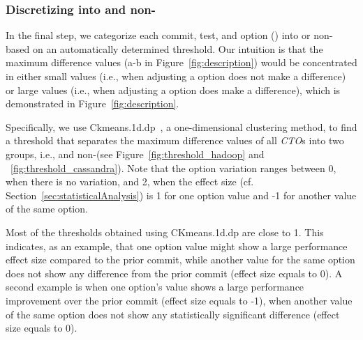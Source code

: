 

\subsubsection{Discretizing \instance into \inconsistent and non-\inconsistent}
\label{sec:discretizing}
In the final step, we categorize each commit, test, and option (\instance) into \inconsistent or non-\inconsistent %
based on an automatically determined threshold. Our intuition is that the maximum difference values (a-b in Figure~\ref{fig:description}) would be concentrated in either small values %
(i.e., when adjusting a option does not make a difference) or large values (i.e., when adjusting a option does make a difference), which is demonstrated in Figure~\ref{fig:description}. %

Specifically, we use Ckmeans.1d.dp~\cite{Ckmeans138:online}, a one-dimensional clustering method, to find a threshold that separates the maximum difference values of all \emph{CTO}s %
into two groups, i.e., \inconsistent and non-\inconsistent (see Figure~\ref{fig:threshold_hadoop} and ~\ref{fig:threshold_cassandra}). Note that the option variation ranges between 0, when there is no variation, and 2, when the effect size (cf. Section~\ref{sec:statisticalAnalysis}) is 1 for one option value and -1 for another value of the same option.

Most of the thresholds obtained using CKmeans.1d.dp are close to 1. This indicates, as an example, that one option value might show a large performance effect size compared to the prior commit, while another value for the same option does not show any difference from the prior commit (effect size equals to 0). A second example is when one option's value shows a large performance improvement over the prior commit (effect size equals to -1), when another value of the same option does not show any statistically significant difference (effect size equals to 0).

